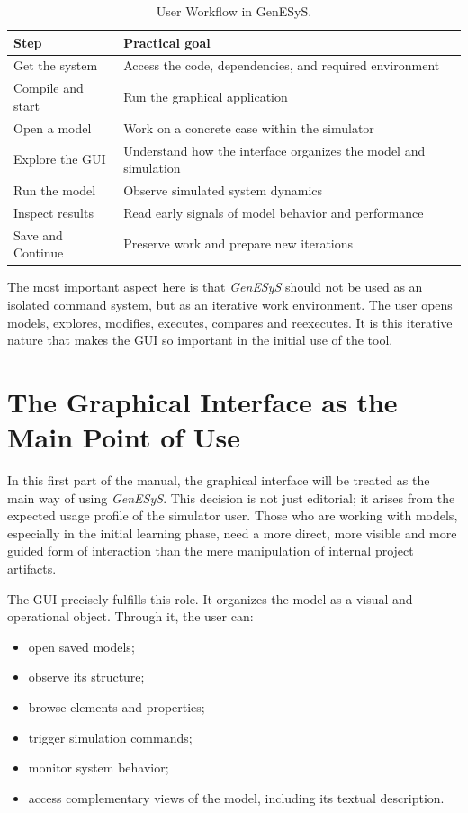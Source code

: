 \begin{table}[htbp]
\centering
\caption{User Workflow in GenESyS.}
 \label{tab:cap1_fluxo_usuario}
\small
 \begin{tabular}{|p{4.0cm}|p{7.4cm}|}
\hline
\textbf{Step} & \textbf{Practical goal} \\
\hline
Get the system & Access the code, dependencies, and required environment \\
\hline
Compile and start & Run the graphical application \\
\hline
Open a model & Work on a concrete case within the simulator \\
\hline
Explore the GUI & Understand how the interface organizes the model and simulation \\
\hline
Run the model & Observe simulated system dynamics \\
\hline
Inspect results & Read early signals of model behavior and performance \\
\hline
Save and Continue & Preserve work and prepare new iterations \\
\hline
 \end{tabular}
\end{table}

The most important aspect here is that \textit{GenESyS} should not be used as an isolated command system, but as an iterative work environment. The user opens models, explores, modifies, executes, compares and reexecutes. It is this iterative nature that makes the GUI so important in the initial use of the tool.

\section{The Graphical Interface as the Main Point of Use}
\label{sec:cap1_gui_ponto_principal}

In this first part of the manual, the graphical interface will be treated as the main way of using \textit{GenESyS}. This decision is not just editorial; it arises from the expected usage profile of the simulator user. Those who are working with models, especially in the initial learning phase, need a more direct, more visible and more guided form of interaction than the mere manipulation of internal project artifacts.

The GUI precisely fulfills this role. It organizes the model as a visual and operational object. Through it, the user can:
\begin{itemize}
\item open saved models;
\item observe its structure;
\item browse elements and properties;
\item trigger simulation commands;
\item monitor system behavior;
\item access complementary views of the model, including its textual description.
\end{itemize}

